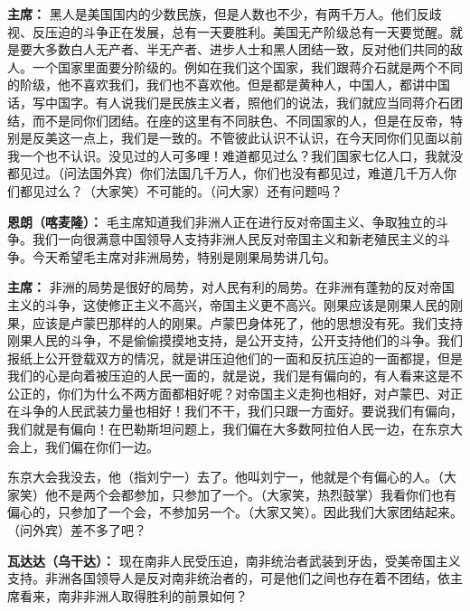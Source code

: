 \begin{list}{}
\item[\textbf{主席：}] 黑人是美国国内的少数民族，但是人数也不少，有两千万人。他们反歧视、反压迫的斗争正在发展，总有一天要胜利。美国无产阶级总有一天要觉醒。就是要大多数白人无产者、半无产者、进步人士和黑人团结一致，反对他们共同的敌人。一个国家里面要分阶级的。例如在我们这个国家，我们跟蒋介石就是两个不同的阶级，他不喜欢我们，我们也不喜欢他。但是都是黄种人，中国人，都讲中国话，写中国字。有人说我们是民族主义者，照他们的说法，我们就应当同蒋介石团结，而不是同你们团结。在座的这里有不同肤色、不同国家的人，但是在反帝，特别是反美这一点上，我们是一致的。不管彼此认识不认识，在今天同你们见面以前我一个也不认识。没见过的人可多哩！难道都见过么？我们国家七亿人口，我就没都见过。（问法国外宾）你们法国几千万人，你们也没有都见过，难道几千万人你们都见过么？（大家笑）不可能的。（问大家）还有问题吗？

\item[\textbf{恩朗（喀麦隆）：}] 毛主席知道我们非洲人正在进行反对帝国主义、争取独立的斗争。我们一向很满意中国领导人支持非洲人民反对帝国主义和新老殖民主义的斗争。今天希望毛主席对非洲局势，特别是刚果局势讲几句。

\item[\textbf{主席：}] 非洲的局势是很好的局势，对人民有利的局势。在非洲有蓬勃的反对帝国主义的斗争，这使修正主义不高兴，帝国主义更不高兴。刚果应该是刚果人民的刚果，应该是卢蒙巴那样的人的刚果。卢蒙巴身体死了，他的思想没有死。我们支持刚果人民的斗争，不是偷偷摸摸地支持，是公开支持，公开支持他们的斗争。我们报纸上公开登载双方的情况，就是讲压迫他们的一面和反抗压迫的一面都提，但是我们的心是向着被压迫的人民一面的，就是说，我们是有偏向的，有人看来这是不公正的，你们为什么不两方面都相好呢？对帝国主义走狗也相好，对卢蒙巴、对正在斗争的人民武装力量也相好！我们不干，我们只跟一方面好。要说我们有偏向，我们就是有偏向！在巴勒斯坦问题上，我们偏在大多数阿拉伯人民一边，在东京大会上，我们偏在你们一边。

东京大会我没去，他（指刘宁一）去了。他叫刘宁一，他就是个有偏心的人。（大家笑）他不是两个会都参加，只参加了一个。（大家笑，热烈鼓掌）我看你们也有偏心的，只参加了一个会，不参加另一个。（大家又笑）。因此我们大家团结起来。（问外宾）差不多了吧？

\item[\textbf{瓦达达（乌干达）：}] 现在南非人民受压迫，南非统治者武装到牙齿，受美帝国主义支持。非洲各国领导人是反对南非统治者的，可是他们之间也存在着不团结，依主席看来，南非非洲人取得胜利的前景如何？


\end{list}
